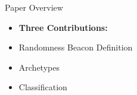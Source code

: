 \begin{frame}{Paper Overview}
    \begin{itemize}
        \item \textbf{Three Contributions:}
        \item Randomness Beacon Definition
        \item Archetypes
        \item Classification
    \end{itemize}        
\end{frame}
